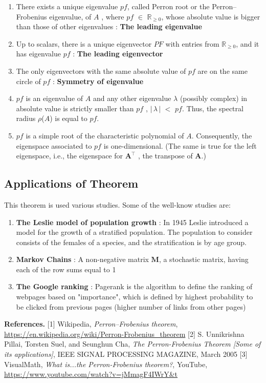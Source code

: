 \documentclass[11pt,a4,twocolumn]{article}
\newcommand{\hAbs}[1]{\ensuremath{\left \lvert \, #1 \, \right \rvert} } %
\theoremstyle{plain}
\theoremstyle{definition}
\theoremstyle{remark}
\begin{document}
\begin{enumerate}
\item There exists a unique eigenvalue $pf$, called Perron root or the Perron–Frobenius eigenvalue, of $A$ , where $pf$ $\in$ $\mathbb{R}_{\geq 0}$, whose absolute value is bigger than those of other eigenvalues :  \textbf{The leading eigenvalue} 
\item Up to scalars, there is a unique eigenvector $PF$ with entries from  $\mathbb{R}_{\geq 0}$, and it has eigenvalue $pf$ :  \textbf{The leading eigenvector} 
\item The only eigenvectors with the same absolute value of $pf$ are on the same circle of $pf$ :  \textbf{Symmetry of eigenvalue} 
\item  $pf$ is an eigenvalue of $A$ and any other eigenvalue $\lambda$ (possibly complex) in absolute value is strictly smaller than $pf$ , \hAbs{\lambda} $<$ $pf$. Thus, the spectral radius $\rho$($A$) is equal to $pf$. 
\item $pf$ is a simple root of the characteristic polynomial of $A$. Consequently, the eigenspace associated to $pf$ is one-dimensional.  (The same is true for the left eigenspace, i.e., the eigenspace for $\mathbf{A}^{\top}$ , the transpose of $\mathbf{A}$.)

\end{enumerate}


\subsection{Applications of Theorem}

This theorem is used various studies. Some of the well-know studies are:



\begin{enumerate}
\item \textbf{The Leslie model of population growth} : In 1945 Leslie introduced a model for the growth of a stratified population. The population to consider consists of the females of a species, and the stratification is by age group. 
\item \textbf{Markov Chains} : A non-negative matrix $\mathbf{M}$, a stochastic matrix, having each of the row sums equal to 1
\item \textbf{The Google ranking} : Pagerank is the algorithm to define the ranking of webpages based on "importance", which is defined by highest probability to be clicked from previous pages (higher number of links from other pages)
\end{enumerate}




\textbf{References.}
{\footnotesize [1] Wikipedia, \textit{Perron–Frobenius theorem}, \url{https://en.wikipedia.org/wiki/Perron-Frobenius_theorem} }
{\footnotesize [2] S. Unnikrishna Pillai, Torsten Suel, and Seunghun Cha, \textit{The Perron-Frobenius Theorem [Some of its applications]}, IEEE SIGNAL PROCESSING MAGAZINE, March 2005 }
{\footnotesize [3] VisualMath, \textit{What is...the Perron-Frobenius theorem?}, YouTube, \url{https://www.youtube.com/watch?v=jMmagF4IWrY&t} }
\end{document}
